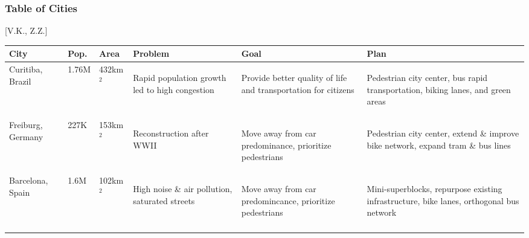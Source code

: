 \documentclass[12pt]{article}                       %
\begin{document}
\newpage
\subsubsection{Table of Cities}[V.K., Z.Z.]
\begin{table}[H]
    \centering
    \singlespacing
    \small
    \begin{tabular}{ m{1.7cm} | m{1.1cm} | m{1.3cm} | m{3.4cm} | m{3.4cm} | m{3.4cm} }
        \textbf{City} & \textbf{Pop.} & \textbf{Area} & \textbf{Problem} & \textbf{Goal} & \textbf{Plan} \\
        \hline{}
        Curitiba, Brazil &
        1.76M &
        432km$^2$ &
        \begin{flushleft}Rapid population growth led to high congestion \end{flushleft} &
        \begin{flushleft}Provide better quality of life and transportation for citizens\end{flushleft} &
        \begin{flushleft}Pedestrian city center, bus rapid transportation, biking lanes, and green areas\end{flushleft} \\ 
        \hline{}
        
        Freiburg, Germany &
        227K &
        153km$^2$ &
        \begin{flushleft}Reconstruction after WWII \end{flushleft} &
        \begin{flushleft}Move away from car predominance, prioritize pedestrians\end{flushleft} &
        \begin{flushleft}Pedestrian city center, extend \& improve bike network, expand tram \& bus lines\end{flushleft} \\
        \hline{}
        
        Barcelona, Spain &
        1.6M &
        102km$^2$ &
        \begin{flushleft}High noise \& air pollution, saturated streets\end{flushleft} &
        \begin{flushleft}Move away from car predomincance, prioritize pedestrians\end{flushleft} &
        \begin{flushleft}Mini-superblocks, repurpose existing infrastructure, bike lanes, orthogonal bus network\end{flushleft} \\
        \hline{}
        

\end{tabular}
\end{table}
\end{document}
